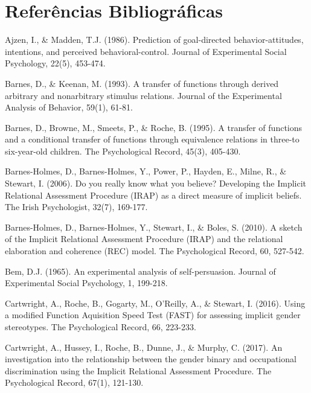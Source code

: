 \section*{Referências Bibliográficas}

\hangindent=25pt
\noindent Ajzen, I., \& Madden, T.J. (1986). Prediction of goal-directed behavior-attitudes, intentions, and perceived behavioral-control. Journal of Experimental Social Psychology, 22(5), 453-474.

\hangindent=25pt
\noindent Barnes, D., \& Keenan, M. (1993). A transfer of functions through derived arbitrary and nonarbitrary stimulus relations. Journal of the Experimental Analysis of Behavior, 59(1), 61-81.

\hangindent=25pt
\noindent Barnes, D., Browne, M., Smeets, P., \& Roche, B. (1995). A transfer of functions and a conditional transfer of functions through equivalence relations in three-to six-year-old children. The Psychological Record, 45(3), 405-430.

\hangindent=25pt
\noindent Barnes-Holmes, D., Barnes-Holmes, Y., Power, P., Hayden, E., Milne, R., \& Stewart, I. (2006). Do you really know what you believe? Developing the Implicit Relational Assessment Procedure (IRAP) as a direct measure of implicit beliefs. The Irish Psychologist, 32(7), 169-177.

\hangindent=25pt
\noindent Barnes-Holmes, D., Barnes-Holmes, Y., Stewart, I., \& Boles, S. (2010). A sketch of the Implicit Relational Assessment Procedure (IRAP) and the relational elaboration and coherence (REC) model. The Psychological Record, 60, 527-542.

\hangindent=25pt
\noindent Bem, D.J. (1965). An experimental analysis of self-persuasion. Journal of Experimental Social Psychology, 1, 199-218.

\hangindent=25pt
\noindent Cartwright, A., Roche, B., Gogarty, M., O'Reilly, A., \& Stewart, I. (2016). Using a modified Function Aquisition Speed Test (FAST) for assessing implicit gender stereotypes. The Psychological Record, 66, 223-233.

\hangindent=25pt
\noindent Cartwright, A., Hussey, I., Roche, B., Dunne, J., \& Murphy, C. (2017). An investigation into the relationship between the gender binary and occupational discrimination using the Implicit Relational Assessment Procedure. The Psychological Record, 67(1), 121-130.

